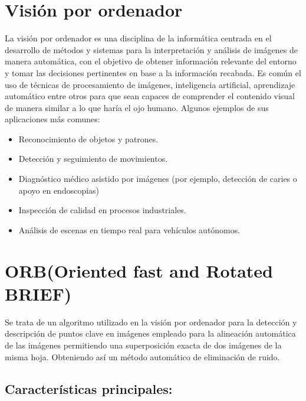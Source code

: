  

\section{Visión por ordenador}


La visión por ordenador \cite{Andrade2014PropuestaDU}es una disciplina de la informática centrada en el desarrollo de métodos y sistemas para la interpretación y análisis de imágenes de manera automática, con el objetivo de obtener información relevante del entorno y tomar las decisiones pertinentes en base a la información recabada. Es común el uso de técnicas de procesamiento de imágenes, inteligencia artificial, aprendizaje automático entre otros para que sean capaces de comprender el contenido visual de manera similar a lo que haría el ojo humano.
Algunos ejemplos de sus aplicaciones más comunes:

\begin{itemize}
    \item Reconocimiento de objetos y patrones.
    \item Detección y seguimiento de movimientos.
    \item Diagnóstico médico asistido por imágenes (por ejemplo, detección de caries o apoyo en endoscopias)
    \item Inspección de calidad en procesos industriales.
    \item Análisis de escenas en tiempo real para vehículos autónomos.
\end{itemize}


\section{\textbf{ }ORB(Oriented fast and Rotated BRIEF)}
Se trata de un algoritmo utilizado en la visión por ordenador para la detección y descripción de puntos clave en imágenes\cite{Luo_2019} empleado para la alineación automática de las imágenes permitiendo una superposición exacta de dos imágenes de la misma hoja. Obteniendo así un método automático de eliminación de ruido.
\subsection{Características principales:}

